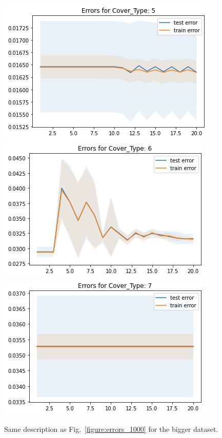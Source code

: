 \documentclass{scrartcl}
\begin{document}
\begin{figure}
{\includegraphics[width=.45\textwidth]{imgs/N100000_T20/cv_5_big.png}} \\
{\includegraphics[width=.45\textwidth]{imgs/N100000_T20/cv_6_big.png}} \quad
{\includegraphics[width=.45\textwidth]{imgs/N100000_T20/cv_7_big.png}}
\caption{Same description as Fig.~\ref{figure:errors_1000} for the bigger dataset.}
\label{figure:errors_big}
\end{figure}
\end{document}
